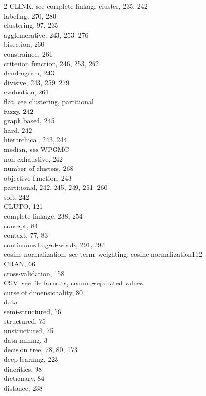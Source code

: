 \documentclass[twoside,11pt]{book}
\begin{document}
\begin{multicols}{2}
CLINK, see complete linkage cluster, 235, 242\\
labeling, 270, 280\\
clustering, 97, 235\\
agglomerative, 243, 253, 276\\
bisection, 260\\
constrained, 261\\
criterion function, 246, 253, 262\\
dendrogram, 243\\
divisive, 243, 259, 279\\
evaluation, 261\\
flat, see clustering, partitional\\
fuzzy, 242\\
graph based, 245\\
hard, 242\\
hierarchical, 243, 244\\
median, see WPGMC\\
non-exhaustive, 242\\
number of clusters, 268\\
objective function, 243\\
partitional, 242, 245, 249, 251, 260\\
soft, 242\\
CLUTO, 121\\
complete linkage, 238, 254\\
concept, 84\\
context, 77, 83\\
continuous bag-of-words, 291, 292\\
cosine normalization, see term, weighting, cosine normalization112\\
CRAN, 66\\
cross-validation, 158\\
CSV, see file formats, comma-separated values\\
curse of dimensionality, 80\\
data\\
semi-structured, 76\\
structured, 75\\
unstructured, 75\\
data mining, 3\\
decision tree, 78, 80, 173\\
deep learning, 223\\
diacritics, 98\\
dictionary, 84\\
distance, 238\\

\end{multicols}
\end{document}
